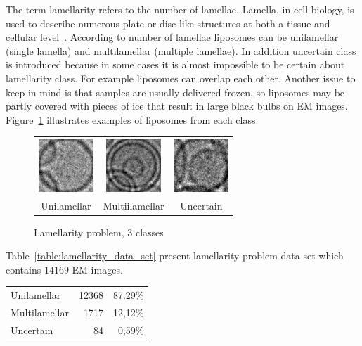 \documentclass[a4paper, 11pt, table]{article}
\begin{document}
The term lamellarity refers to the number of lamellae. Lamella, in cell biology, is used to describe numerous plate or disc-like structures at both a tissue and cellular level~\cite{cammack2006oxford}. According to number of lamellae liposomes can be unilamellar (single lamella) and multilamellar (multiple lamellae). In addition uncertain class is introduced because in some cases it is almost impossible to be certain about lamellarity class. For example liposomes can overlap each other. Another issue to keep in mind is that samples are usually delivered frozen, so liposomes may be partly covered with pieces of ice that result in large black bulbs on EM images. Figure~\ref{fig:lamellarity_problem} illustrates examples of liposomes from each class.

\begin{figure}[H]
\centering
\begin{tabular}{ccc}
	\includegraphics[height=2cm, keepaspectratio]{problem_description/lamellarity/uni} & \includegraphics[height=2cm, keepaspectratio]{problem_description/lamellarity/multi} & \includegraphics[height=2cm, keepaspectratio]{problem_description/lamellarity/uncertain} \\
	Unilamellar & Multiilamellar & Uncertain \\[6pt]
\end{tabular}
\caption{Lamellarity problem, 3 classes}
\label{fig:lamellarity_problem}
\end{figure}

Table~\ref{table:lamellarity_data_set} present lamellarity problem data set which contains $\num{14169}$ EM images.

\begin{center}
\label{table:lamellarity_data_set}
\begin{tabular}{lrr}
\toprule
Unilamellar & \num{12368} & 87.29\% \\ 
Multilamellar & \num{1717} & 12,12\% \\ 
Uncertain & \num{84} & 0,59\% \\ 
\end{tabular} 
\end{center}
\end{document}
